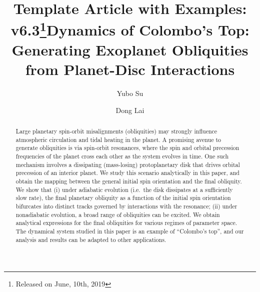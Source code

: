 


\title{Template \aastex Article with Examples:
v6.3\footnote{Released on June, 10th, 2019}}

\title{Dynamics of Colombo's Top: Generating Exoplanet Obliquities from
Planet-Disc Interactions}



\author[0000-0001-8283-3425]{Yubo Su}%

\author[0000-0002-1934-6250]{Dong Lai}%

\begin{abstract}

Large planetary spin-orbit misalignments (obliquities) may strongly influence
atmospheric circulation and tidal heating in the planet. A promising avenue to
generate obliquities is via spin-orbit resonances, where the spin and orbital
precession frequencies of the planet cross each other as the system evolves in
time. One such mechanism involves a dissipating (mass-losing) protoplanetary
disk that drives orbital precession of an interior planet. We study this
scenario analytically in this paper, and obtain the mapping between the general
initial spin orientation and the final obliquity. We show that (i) under
adiabatic evolution (i.e.\ the disk dissipates at a sufficiently slow rate), the
final planetary obliquity as a function of the initial spin orientation
bifurcates into distinct tracks governed by interactions with the resonance;
(ii) under nonadiabatic evolution, a broad range of obliquities can be excited.
We obtain analytical expressions for the final obliquities for various
regimes of parameter space. The dynamical system studied in this paper is an
example of ``Colombo's top'', and our analysis and results can be adapted to
other applications.

\end{abstract}

